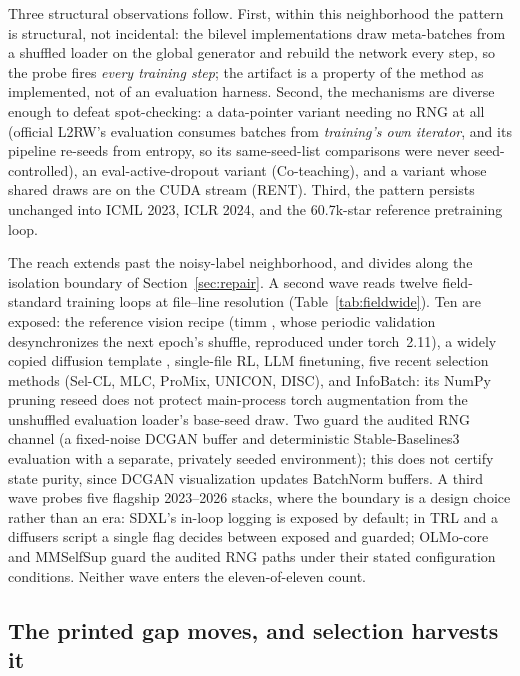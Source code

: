 Three structural observations follow. First, within this neighborhood the
pattern is structural, not incidental: the bilevel implementations draw meta-batches from a
shuffled loader on the global generator and rebuild the network
every step, so the probe fires \emph{every training step}; the artifact is a
property of the method as implemented, not of an evaluation harness. Second,
the mechanisms are diverse enough to defeat spot-checking: a data-pointer
variant needing no RNG at all (official L2RW's evaluation consumes batches from
\emph{training's own iterator}, and its pipeline re-seeds from entropy, so its
same-seed-list comparisons were never seed-controlled), an eval-active-dropout
variant (Co-teaching), and a variant whose shared draws are on the CUDA
stream (RENT). Third, the pattern
persists unchanged into ICML 2023, ICLR 2024, and the 60.7k-star reference
pretraining loop.

The reach extends past the noisy-label neighborhood, and divides along the
isolation boundary of Section~\ref{sec:repair}. A second wave reads twelve
field-standard training loops at file--line resolution
(Table~\ref{tab:fieldwide}). Ten are exposed: the reference vision recipe (timm
\citep{wightman2019timm}, whose periodic validation desynchronizes the next
epoch's shuffle, reproduced under torch~2.11), a widely copied diffusion
template \citep{lucidrains2020ddpm}, single-file RL, LLM finetuning, five
recent selection methods (Sel-CL, MLC, ProMix, UNICON, DISC), and InfoBatch:
its NumPy pruning reseed does not protect main-process torch augmentation
from the unshuffled evaluation loader's base-seed draw. Two guard the audited
RNG channel (a fixed-noise DCGAN buffer and deterministic Stable-Baselines3
evaluation with a separate, privately seeded environment); this does not
certify state purity, since DCGAN visualization updates BatchNorm buffers. A third wave
probes five flagship 2023--2026 stacks, where the boundary is a design choice
rather than an era: SDXL's in-loop logging is exposed by default; in TRL and a
diffusers script a single flag decides between exposed and guarded; OLMo-core
and MMSelfSup guard the audited RNG paths under their stated configuration conditions.
Neither wave enters the eleven-of-eleven count.

\subsection{The printed gap moves, and selection harvests it}
\label{sec:harvest}

